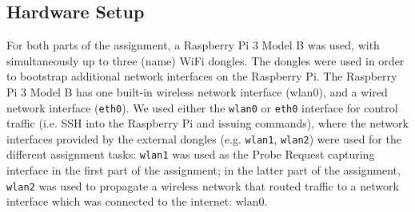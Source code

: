 \documentclass[sigconf,nonacm]{acmart}
\begin{document}
\subsection{Hardware Setup}
\label{sec:hardware_setup}
For both parts of the assignment, a Raspberry Pi 3 Model B was used, with simultaneously up to three (name) WiFi dongles. The dongles were used in order to bootstrap additional network interfaces on the Raspberry Pi. The Raspberry Pi 3 Model B has one built-in wireless network interface (wlan0), and a wired network interface (\verb|eth0|). We used either the \verb|wlan0| or \verb|eth0| interface for control traffic (i.e. SSH into the Raspberry Pi and issuing commands), where the network interfaces provided by the external dongles (e.g. \verb|wlan1|, \verb|wlan2|) were used for the different assignment tasks: \verb|wlan1| was used as the Probe Request capturing interface in the first part of the assignment; in the latter part of the assignment, \verb|wlan2| was used to propagate a wireless network that routed traffic to a network interface which was connected to the internet: wlan0.
\end{document}
